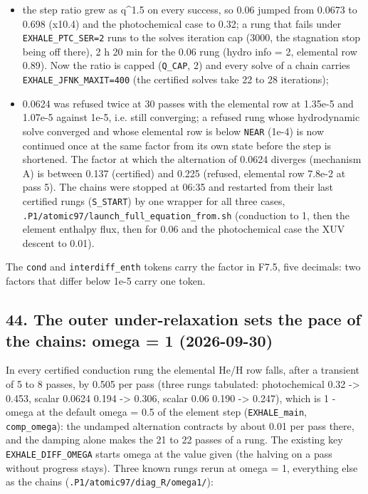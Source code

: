 \documentclass[english,a4paper]{my_memo}
\providecommand{\tightlist}{\setlength{\itemsep}{0pt}\setlength{\parskip}{0pt}}
\begin{document}
\begin{itemize}
\tightlist
\item
  the step ratio grew as q\^{}1.5 on every success, so 0.06 jumped from 0.0673
  to 0.698 (x10.4) and the photochemical case to 0.32; a rung that fails
  under \texttt{EXHALE\_PTC\_SER=2} runs to the solve\textquotesingle s iteration cap (3000, the
  stagnation stop being off there), 2 h 20 min for the 0.06 rung (hydro
  info = 2, elemental row 0.89). Now the ratio is capped (\texttt{Q\_CAP}, 2) and
  every solve of a chain carries \texttt{EXHALE\_JFNK\_MAXIT=400} (the certified
  solves take 22 to 28 iterations);
\item
  0.0624 was refused twice at 30 passes with the elemental row at 1.35e-5
  and 1.07e-5 against 1e-5, i.e. still converging; a refused rung whose
  hydrodynamic solve converged and whose elemental row is below \texttt{NEAR}
  (1e-4) is now continued once at the same factor from its own state before
  the step is shortened.
  The factor at which the alternation of 0.0624 diverges (mechanism A) is
  between 0.137 (certified) and 0.225 (refused, elemental row 7.8e-2 at pass
  5). The chains were stopped at 06:35 and restarted from their last
  certified rungs (\texttt{S\_START}) by one wrapper for all three cases,
  \texttt{.P1/atomic97/launch\_full\_equation\_from.sh} (conduction to 1, then the
  element enthalpy flux, then for 0.06 and the photochemical case the XUV
  descent to 0.01).
\end{itemize}

The \texttt{cond} and \texttt{interdiff\_enth} tokens carry the factor in F7.5, five
decimals: two factors that differ below 1e-5 carry one token.

\subsection{44. The outer under-relaxation sets the pace of the chains: omega = 1 (2026-09-30)}\label{44-the-outer-under-relaxation-sets-the-pace-of-the-chains-omega--1-2026-09-30}

In every certified conduction rung the elemental He/H row falls, after a
transient of 5 to 8 passes, by 0.505 per pass (three rungs tabulated:
photochemical 0.32 -\textgreater{} 0.453, scalar 0.0624 0.194 -\textgreater{} 0.306, scalar 0.06
0.190 -\textgreater{} 0.247), which is 1 - omega at the default omega = 0.5 of the
element step (\texttt{EXHALE\_main}, \texttt{comp\_omega}): the undamped alternation
contracts by about 0.01 per pass there, and the damping alone makes the 21
to 22 passes of a rung. The existing key \texttt{EXHALE\_DIFF\_OMEGA} starts omega
at the value given (the halving on a pass without progress stays). Three
known rungs rerun at omega = 1, everything else as the chains
(\texttt{.P1/atomic97/diag\_R/omega1/}):
\end{document}
